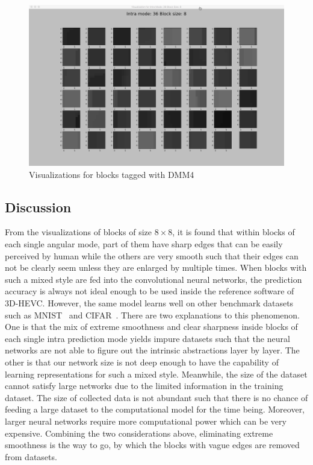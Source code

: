 \begin{figure}
        \vspace*{1cm} %
    
        \begin{minipage}{0.49\textwidth}
            \includegraphics[width=\linewidth]{Figures/visu-size8x8/8-36}
            \caption[Visualizations for blocks tagged with DMM4]{Visualizations for blocks tagged with DMM4}
            \label{fig:size8_mode36}
        \end{minipage}
    \end{figure}

\subsection{Discussion}\label{subsec:discussion-about-data-visu}
From the visualizations of blocks of size \(8\times8\),
it is found that within blocks of each single angular mode,
part of them have sharp edges that can 
be easily perceived by human while the others 
are very smooth such that their edges can not be clearly seem
unless they are enlarged by multiple times.
When blocks with such a mixed style are fed into the 
convolutional neural networks, the prediction accuracy
is always not ideal enough to be used
inside the reference software of 3D-HEVC\@.
However, the same model learns well on other 
benchmark datasets such as 
MNIST~\parencite{XRN001} and CIFAR~\parencite{XRN002}.
There are two explanations to this phenomenon.
One is that the mix of extreme smoothness and
clear sharpness inside blocks of each single 
intra prediction mode
yields impure datasets such that the neural networks
are not able to figure out the intrinsic abstractions
layer by layer.
The other is that our network size is not deep enough
to have the capability of learning representations 
for such a mixed style. 
Meanwhile, the size of 
the dataset cannot satisfy large networks
due to the limited information in the 
training dataset.
The size of collected data is not abundant such that
there is no chance of feeding a large dataset
to the computational model for the time being.
Moreover, larger neural networks require more 
computational power which can be very expensive.
Combining the two considerations above, 
eliminating extreme smoothness is the way to go,
by which the blocks with vague edges are removed
from datasets.

